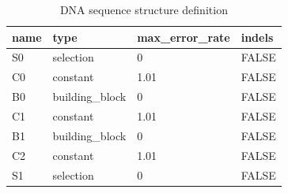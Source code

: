 \begin{table}[htbp]
\centering
\caption{DNA sequence structure definition}
\label{tab:table5}
\begin{tabular}{llll}
\toprule
name & type & max\_error\_rate & indels \\
\midrule
S0 & selection & 0 & FALSE \\
C0 & constant & 1.01 & FALSE \\
B0 & building\_block & 0 & FALSE \\
C1 & constant & 1.01 & FALSE \\
B1 & building\_block & 0 & FALSE \\
C2 & constant & 1.01 & FALSE \\
S1 & selection & 0 & FALSE \\
\bottomrule
\end{tabular}
\end{table}